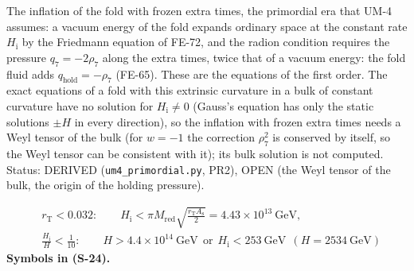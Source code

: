 \documentclass[
  10pt,
]{article}
\begin{document}
The inflation of the fold with frozen extra times, the primordial era
that UM-4 assumes: a vacuum energy of the fold expands ordinary space at
the constant rate \(H_{\mathrm{i}}\) by the Friedmann equation of FE-72,
and the radion condition requires the pressure \(q_7 = -2\rho_7\) along
the extra times, twice that of a vacuum energy: the fold fluid adds
\(q_{\mathrm{hold}} = -\rho_7\) (FE-65). These are the equations of the
first order. The exact equations of a fold with this extrinsic curvature
in a bulk of constant curvature have no solution for
\(H_{\mathrm{i}} \ne 0\) (Gauss's equation has only the static solutions
\(\pm H\) in every direction), so the inflation with frozen extra times
needs a Weyl tensor of the bulk (for \(w = -1\) the correction
\(\rho_7^2\) is conserved by itself, so the Weyl tensor can be
consistent with it); its bulk solution is not computed. Status: DERIVED
(\texttt{um4\_primordial.py}, PR2), OPEN (the Weyl tensor of the bulk,
the origin of the holding pressure).

\[
\begin{aligned}
&r_{\mathrm{T}} < 0.032:\qquad H_{\mathrm{i}} < \pi M_{\mathrm{red}}\sqrt{\frac{r_{\mathrm{T}}A_{\mathrm{s}}}{2}} = 4.43\times10^{13}\ \text{GeV},\\
&\frac{H_{\mathrm{i}}}{H} < \frac{1}{10}:\qquad H > 4.4\times10^{14}\ \text{GeV}\ \ \text{or}\ \ H_{\mathrm{i}} < 253\ \text{GeV}\ \ (H = 2534\ \text{GeV})
\end{aligned} \tag{S-24}
\] \textbf{Symbols in (S-24).}
\end{document}
